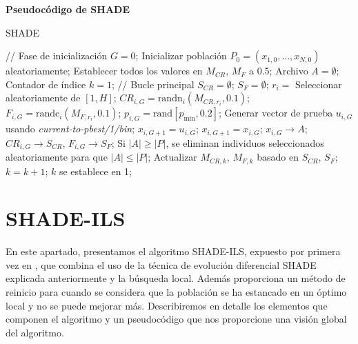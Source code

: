 \newpage

\noindent\textbf{Pseudocódigo de SHADE}

\begin{algorithm}
\caption{SHADE}
\begin{algorithmic}[1]
\STATE // Fase de inicialización
\STATE $G = 0$;
\STATE Inicializar población $P_0 = (x_{1,0}, \ldots, x_{N,0})$ aleatoriamente;
\STATE Establecer todos los valores en $M_{CR}$, $M_F$ a 0.5;
\STATE Archivo $A = \emptyset$;
\STATE Contador de índice $k = 1$;
\STATE // Bucle principal
    \STATE $S_{CR} = \emptyset$; $S_F = \emptyset$;
        \STATE $r_i =$ Seleccionar aleatoriamente de $[1, H]$;
        \STATE $CR_{i,G} = \text{randn}_i(M_{CR,r_i}, 0.1)$;
        \STATE $F_{i,G} = \text{randc}_i(M_{F,r_i}, 0.1)$;
        \STATE $p_{i,G} = \text{rand}[p_{\min}, 0.2]$;
        \STATE Generar vector de prueba $u_{i,G}$ usando \textit{current-to-pbest/1/bin};
    \ENDFOR
            \STATE $x_{i,G+1} = u_{i,G}$;
        \ELSE
            \STATE $x_{i,G+1} = x_{i,G}$;
        \ENDIF
            \STATE $x_{i,G} \rightarrow A$;
            \STATE $CR_{i,G} \rightarrow S_{CR}$, $F_{i,G} \rightarrow S_F$;
        \ENDIF
    \ENDFOR
    \STATE Si $|A| \geq |P|$, se eliminan individuos seleccionados aleatoriamente para que $|A| \leq |P|$;
        \STATE Actualizar $M_{CR,k}$, $M_{F,k}$ basado en $S_{CR}$, $S_F$;
        \STATE $k = k + 1$;
            \STATE $k$ se establece en 1;
        \ENDIF
    \ENDIF
\ENDWHILE
\end{algorithmic}
\end{algorithm}

\newpage

\section{SHADE-ILS}
En este apartado, presentamos el algoritmo SHADE-ILS, expuesto por primera vez en \cite{Molina2018}, que combina el uso de la técnica de evolución diferencial SHADE explicada anteriormente y la búsqueda local. Además proporciona un método de reinicio para cuando se considera que la población se ha estancado en un óptimo local y no se puede mejorar más. Describiremos en detalle los elementos que componen el algoritmo y un pseudocódigo que nos proporcione una visión global del algoritmo.

